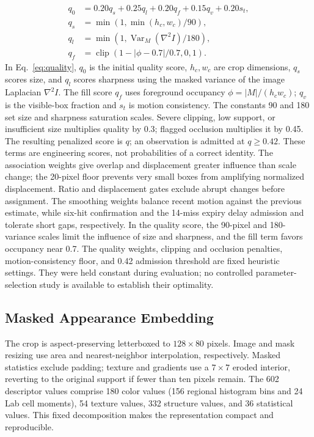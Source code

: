 \documentclass[conference]{IEEEtran}
\begin{document}
\begin{equation}
\begin{aligned}
q_0&=0.20q_s+0.25q_l+0.20q_f+0.15q_v+0.20s_t,\\
q_s&=\min(1,\min(h_c,w_c)/90),\\
q_l&=\min(1,\operatorname{Var}_{M}(\nabla^2I)/180),\\
q_f&=\operatorname{clip}(1-|\phi-0.7|/0.7,0,1).
\end{aligned}
\label{eq:quality}
\end{equation}
In Eq.~\eqref{eq:quality}, $q_0$ is the initial quality score, $h_c,w_c$ are crop dimensions, $q_s$ scores size, and $q_l$ scores sharpness using the masked variance of the image Laplacian $\nabla^2 I$. The fill score $q_f$ uses foreground occupancy $\phi=|M|/(h_cw_c)$; $q_v$ is the visible-box fraction and $s_t$ is motion consistency. The constants 90 and 180 set size and sharpness saturation scales. Severe clipping, low support, or insufficient size multiplies quality by 0.3; flagged occlusion multiplies it by 0.45. The resulting penalized score is $q$; an observation is admitted at $q\ge0.42$. These terms are engineering scores, not probabilities of a correct identity. The association weights give overlap and displacement greater influence than scale change; the 20-pixel floor prevents very small boxes from amplifying normalized displacement. Ratio and displacement gates exclude abrupt changes before assignment. The smoothing weights balance recent motion against the previous estimate, while six-hit confirmation and the 14-miss expiry delay admission and tolerate short gaps, respectively. In the quality score, the 90-pixel and 180-variance scales limit the influence of size and sharpness, and the fill term favors occupancy near 0.7. The quality weights, clipping and occlusion penalties, motion-consistency floor, and 0.42 admission threshold are fixed heuristic settings. They were held constant during evaluation; no controlled parameter-selection study is available to establish their optimality.

\subsection{Masked Appearance Embedding}
The crop is aspect-preserving letterboxed to $128\times80$ pixels. Image and mask resizing use area and nearest-neighbor interpolation, respectively. Masked statistics exclude padding; texture and gradients use a $7\times7$ eroded interior, reverting to the original support if fewer than ten pixels remain. The 602 descriptor values comprise 180 color values (156 regional histogram bins and 24 Lab cell moments), 54 texture values, 332 structure values, and 36 statistical values. This fixed decomposition makes the representation compact and reproducible.
\end{document}
